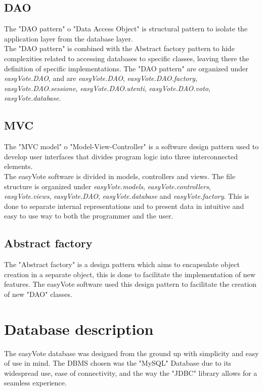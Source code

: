 \documentclass[11pt, oneside]{article}   	%
\begin{document}
\subsection{DAO}
The "DAO pattern" o "Data Access Object" is structural pattern to isolate the application layer from the database layer.\\

The "DAO pattern" is combined with the Abstract factory pattern to hide complexities related to accessing databases to specific classes, leaving there the definition of specific implementations. 
The "DAO pattern" are organized under \emph{easyVote.DAO}, and are \emph{easyVote.DAO}, \emph{easyVote.DAO.factory}, \emph{easyVote.DAO.sessione}, 
\emph{easyVote.DAO.utenti},  \emph{easyVote.DAO.voto},  \emph{easyVote.database}.

\subsection{MVC}
The "MVC model" o "Model-View-Controller" is a software design pattern used to develop user interfaces that divides program logic into three interconnected elements.\\

The easyVote software is divided in models, controllers and views. The file structure is organized under \emph{easyVote.models}, \emph{easyVote.controllers}, \emph{easyVote.views}, \emph{easyVote.DAO}, \emph{easyVote.database} and \emph{easyVote.factory}. This is done to separate internal representations and to present data in intuitive and easy to use way to both the programmer and the user.
\subsection{Abstract factory}
The "Abstract factory" is a design pattern which aims to encapsulate object creation in a separate object, this is done to facilitate the implementation of new features.
The easyVote software used this design pattern to facilitate the creation of new "DAO" classes.

\pagebreak

\section{Database description}
The easyVote database was designed from the ground up with simplicity and easy of use in mind. The DBMS chosen was the "MySQL" Database due to its widespread use, ease of connectivity, and the way the "JDBC" library allows for a seamless experience.
\end{document}
